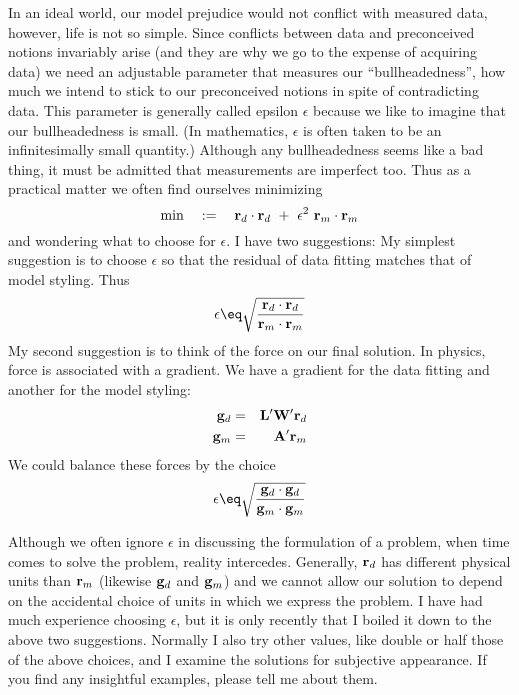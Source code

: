 \par
In an ideal world, our model prejudice would not conflict
with measured data, however,
life is not so simple.
Since conflicts between data and preconceived notions invariably arise
(and they are why we go to the expense of acquiring data)
we need an adjustable parameter
that measures our ``bullheadedness'', how much we intend
to stick to our preconceived notions in spite of contradicting data.
This parameter is generally called epsilon $\epsilon$
because we like to imagine that our bullheadedness is small.
(In mathematics, $\epsilon$ is often taken to be
an infinitesimally small quantity.)
Although any bullheadedness seems like a bad thing,
it must be admitted that measurements are imperfect too.
Thus as a practical matter we often find ourselves minimizing
\begin{equation}
\min \quad := \quad
\bold r_d \cdot \bold r_d \ +\  \epsilon^2\ \bold r_m \cdot \bold r_m 
\end{equation}
and wondering what to choose for $\epsilon$.
I have two suggestions:
My simplest suggestion is to choose $\epsilon$
so that the residual of data fitting matches that of model styling.
Thus
\begin{equation}
\epsilon \eq \sqrt{
\bold r_d \cdot \bold r_d
\over
\bold r_m \cdot \bold r_m 
}
\end{equation}
My second suggestion is to think of the force on our final solution.
In physics, force is associated with a gradient.
We have a gradient for the data fitting
and another for the model styling:
\begin{eqnarray}
\bold g_d &=& \bold L' \bold W' \bold r_d  \\
\bold g_m &=& \bold A' \bold r_m
\end{eqnarray}
We could balance these forces by the choice
\begin{equation}
\epsilon \eq \sqrt{
\bold g_d \cdot \bold g_d
\over
\bold g_m \cdot \bold g_m 
}
\end{equation}

Although we often ignore $\epsilon$ in discussing the formulation
of a problem, when time comes to solve the problem, reality intercedes.
Generally, $\bold r_d$ has different physical units than $\bold r_m$
(likewise $\bold g_d$ and $\bold g_m$)
and we cannot allow our solution
to depend on the accidental choice of units
in which we express the problem.
I have had much experience choosing $\epsilon$, but it is
only recently that I boiled it down to the above two suggestions.
Normally I also try other values, like double or half those
of the above choices,
and I examine the solutions for subjective appearance.
If you find any insightful examples, please tell me about them.

